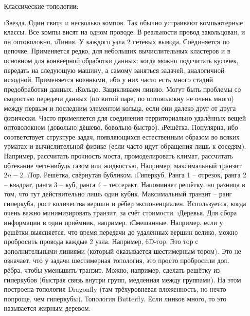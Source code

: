  Классические топологии:
 \begin{enumerate}
 	\i Звезда. Один свитч и несколько компов. Так обычно устраивают компьютерные классы. Все компы висят на одном проводе. В реальности провод закольцован, и он оптоволокно.
 	\i Линия. У каждого узла 2 сетевых вывода. Соединяется по цепочке.
 	Применяется редко, для небольших вычислительных кластеров и в основном для конвеерной обработки данных: когда можно подсчитать кусочек, передать на следующую машину, а самому заняться задачей, аналогичной исходной.
 	Применяется военными, ибо у них часто есть много стадий предобработки данных.
 	\i Кольцо. Зацикливаем линию. Могут быть проблемы со скоростью передачи данных (по витой паре, по оптоволокну не очень много) между первым и последним элементом кольца, если они далеко друг от друга физически.
 	Часто применяется для соединения территориально удалённых вещей оптоволокном (довольно дёшево, бовольно быстро).
 	\i Решётка. 
 	Популярна, ибо соответствует структуре задач, появляющихся естественным образом во всяких урматах и вычислительной физике (если часто идут обращения лишь к соседям). Например, рассчитать прочность моста, промоделировать климат, рассчитать обтекание чего-нибудь газом или жидкостью.
 	Например, максимальный транзит $2n-2$.
 	\i Тор. Решётка, свёрнутая бубликом.
 	\i Гиперкуб. Ранга 1 -- отрезок, ранга 2 -- квадрат, ранга 3 -- куб, ранга 4 -- тессеракт. Напоминает решётку, но разница в том, что тут действительно лишь один кубик.
 	Максимальный транзит -- ранг гиперкуба, рост количества вершин и рёбер экспоненциален.
 	Используется, когда очень важно минимизировать транзит, за счёт стоимости.
 	\i Деревья. 
 	Для сбора информации в один приёмник, например.
 	\i Смешанные. Например, если у решётки выясняется, что время передачи до удалённых вершин велико, можно пробросить провода каждые 2 узла.
 	Например, 6D-тор. Это тор с дополнительными линиями (который оказывается шестимерным тором). Это не означает, что у задачи шестимерная топология, это просто пробросили доп. рёбра, чтобы уменьшить транзит.
 	Можно, например, сделать решётку из гиперкубов (быстрая связь внутри групп, медленная между группами). На этом построена топология Dragonfly (там трёхуровневая вложенность, но нечто попроще, чем гиперкубы). 
 	Топология Butterfly. Если линков много, то это называется жирным деревом.
 \end{enumerate}

